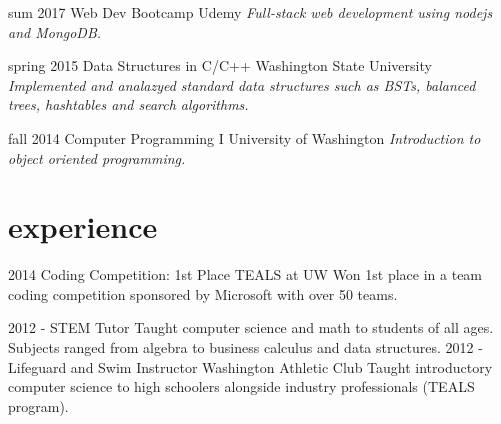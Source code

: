 \documentclass[]{friggeri-cv}
\begin{document}
\begin{entrylist}
  \entry
    {sum 2017}
    {Web Dev Bootcamp}
    {Udemy}
    {\emph{Full-stack web development using nodejs and MongoDB. }}

  \entry
    {spring 2015}
    {Data Structures in C/C++}
    {Washington State University}
    {\emph{Implemented and analazyed standard data structures such as BSTs, balanced trees, hashtables and search algorithms.}}

  \entry
    {fall 2014}
    {Computer Programming I}
    {University of Washington}
    {\emph{Introduction to object oriented programming.}}

\end{entrylist}

\section{experience}

\begin{entrylist}
  \entry
    {2014}
    {Coding Competition: 1st Place}
    {TEALS at UW}
    {Won 1st place in a team coding competition sponsored by Microsoft with over 50 teams.}


  \entry
    {2012 -}
    {STEM Tutor}
    {}
    {Taught computer science and math to students of all ages. Subjects ranged from algebra to business calculus and data structures.}
  \entry
    {2012 - }
    {Lifeguard and Swim Instructor}
    {Washington Athletic Club}
    {Taught introductory computer science to high schoolers alongside industry professionals (TEALS program).}
\end{entrylist}
\end{document}
